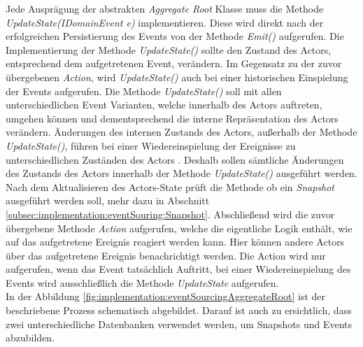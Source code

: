 Jede Ausprägung der abstrakten \textit{Aggregate Root} Klasse muss die Methode \textit{UpdateState(IDomainEvent e)} implementieren. Diese wird direkt nach der erfolgreichen Persistierung des Events von der Methode \textit{Emit()} aufgerufen. Die Implementierung der Methode \textit{UpdateState()} sollte den Zustand des Actors, entsprechend dem aufgetretenen Event, verändern. Im Gegensatz zu der zuvor übergebenen \textit{Action}, wird \textit{UpdateState()} auch bei einer historischen Einspielung der Events aufgerufen. Die Methode \textit{UpdateState()} soll mit allen unterschiedlichen Event Varianten, welche innerhalb des Actors auftreten, umgehen können und dementsprechend die interne Repräsentation des Actors verändern.  Änderungen des internen Zustands des Actors, außerhalb der Methode \textit{UpdateState()}, führen bei einer Wiedereinspielung der Ereignisse zu unterschiedlichen Zuständen des Actors . Deshalb sollen sämtliche Änderungen des Zustands des Actors innerhalb der Methode \textit{UpdateState()} ausgeführt werden. \\
Nach dem Aktualisieren des Actors-State prüft die Methode ob ein \textit{Snapshot} ausgeführt werden soll, mehr dazu in Abschnitt \ref{subsec:implementation:eventSouring:Snapshot}. Abschließend wird die zuvor übergebene Methode \textit{Action} aufgerufen, welche die eigentliche Logik enthält, wie auf das aufgetretene Ereignis reagiert werden kann. Hier können andere Actors über das aufgetretene Ereignis benachrichtigt werden. Die Action wird nur aufgerufen, wenn das Event tatsächlich Auftritt, bei einer Wiedereinspielung des Events wird ausschließlich die Methode \textit{UpdateState} aufgerufen.  \\ 
% 
% 
In der Abbildung \ref{fig:implementation:eventSourcingAggregateRoot} ist der beschriebene Prozess schematisch abgebildet. Darauf ist auch zu ersichtlich, dass zwei unterschiedliche Datenbanken verwendet werden, um Snapshots und Events abzubilden.
